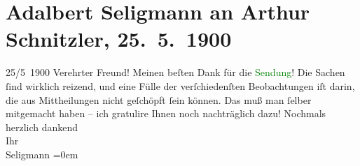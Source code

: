 

               \section[Adalbert Seligmann an Arthur Schnitzler, 25. 5. 1900]{ Adalbert Seligmann an Arthur Schnitzler, 25. 5. 1900}\nopagebreak{}\rehead{ }\normalsize\beginnumbering{} \toendnotes[C]{\smallbreak\pagebreak[2]} 
\toendnotes[C]{\smallbreak}\pstart
           \raggedleft{}{\pb}25/5 1900\pend
           \pstart
           Verehrter Freund! Meinen beſten Dank für die \textcolor{green}{Sendung}{}! Die Sachen ſind wirklich
                    reizend, und eine Fülle der verſchiedenſten Beobachtungen iſt darin, die aus
                    Mittheilungen nicht geſchöpft ſein können. Das muß man ſelber mitgemacht haben –
                    ich gratulire Ihnen noch nachträglich dazu!\pend
           \pstart
           Nochmals herzlich dankend{\\[\baselineskip]}Ihr{\\[\baselineskip]}\spacefill\mbox{Seligmann}\pend
           \leftskip=0em{}\endnumbering{}  
      